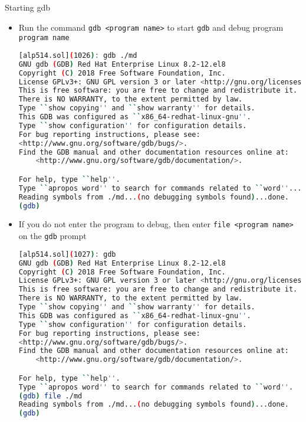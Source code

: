 \documentclass[10pt,t]{beamer}
\begin{document}
\begin{frame}{Starting gdb}
  \begin{itemize}
  \item Run the command \lstinline|gdb <program name>| to start \lstinline|gdb| and debug program \lstinline|program name|
    \begin{lstlisting}[language=bash]
[alp514.sol](1026): gdb ./md
GNU gdb (GDB) Red Hat Enterprise Linux 8.2-12.el8
Copyright (C) 2018 Free Software Foundation, Inc.
License GPLv3+: GNU GPL version 3 or later <http://gnu.org/licenses/gpl.html>
This is free software: you are free to change and redistribute it.
There is NO WARRANTY, to the extent permitted by law.
Type ``show copying'' and ``show warranty'' for details.
This GDB was configured as ``x86_64-redhat-linux-gnu''.
Type ``show configuration'' for configuration details.
For bug reporting instructions, please see:
<http://www.gnu.org/software/gdb/bugs/>.
Find the GDB manual and other documentation resources online at:
    <http://www.gnu.org/software/gdb/documentation/>.

For help, type ``help''.
Type ``apropos word'' to search for commands related to ``word''...
Reading symbols from ./md...(no debugging symbols found)...done.
(gdb)
    \end{lstlisting}
    \framebreak
  \item If you do not enter the program to debug, then enter \lstinline|file <program name>| on the \lstinline|gdb| prompt
    \begin{lstlisting}[language=bash]
[alp514.sol](1027): gdb
GNU gdb (GDB) Red Hat Enterprise Linux 8.2-12.el8
Copyright (C) 2018 Free Software Foundation, Inc.
License GPLv3+: GNU GPL version 3 or later <http://gnu.org/licenses/gpl.html>
This is free software: you are free to change and redistribute it.
There is NO WARRANTY, to the extent permitted by law.
Type ``show copying'' and ``show warranty'' for details.
This GDB was configured as ``x86_64-redhat-linux-gnu''.
Type ``show configuration'' for configuration details.
For bug reporting instructions, please see:
<http://www.gnu.org/software/gdb/bugs/>.
Find the GDB manual and other documentation resources online at:
    <http://www.gnu.org/software/gdb/documentation/>.

For help, type ``help''.
Type ``apropos word'' to search for commands related to ``word''.
(gdb) file ./md
Reading symbols from ./md...(no debugging symbols found)...done.
(gdb)
    \end{lstlisting}
  \end{itemize}
\end{frame}
\end{document}
